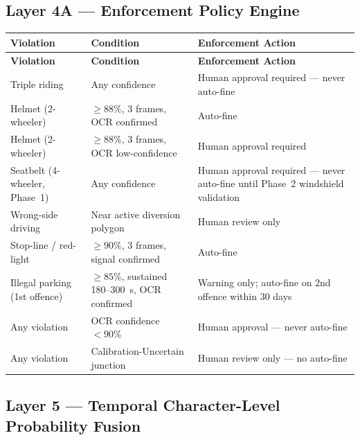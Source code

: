 \documentclass[11pt,a4paper]{article}
\begin{document}
\subsection*{Layer 4A — Enforcement Policy Engine}

\begin{longtable}{L{4cm} L{5cm} L{5.5cm}}
    \toprule
    \color{white}\textbf{Violation} & \color{white}\textbf{Condition} & \color{white}\textbf{Enforcement Action} \\
    \midrule
    \endfirsthead
    \toprule
    \color{white}\textbf{Violation} & \color{white}\textbf{Condition} & \color{white}\textbf{Enforcement Action} \\
    \midrule
    \endhead
    \bottomrule
    \endfoot

    Triple riding & Any confidence & Human approval required — never auto-fine \\
    Helmet (2-wheeler) & $\geq 88\%$, 3 frames, OCR confirmed & Auto-fine \\
    Helmet (2-wheeler) & $\geq 88\%$, 3 frames, OCR low-confidence & Human approval required \\
    Seatbelt (4-wheeler, Phase~1) & Any confidence & Human approval required --- never auto-fine until Phase~2 windshield validation \\
    Wrong-side driving & Near active diversion polygon & Human review only \\
    Stop-line / red-light & $\geq 90\%$, 3 frames, signal confirmed & Auto-fine \\
    Illegal parking (1st offence) & $\geq 85\%$, sustained 180–300~s, OCR confirmed & Warning only; auto-fine on 2nd offence within 30 days \\
    Any violation & OCR confidence $< 90\%$ & Human approval — never auto-fine \\
    Any violation & Calibration-Uncertain junction & Human review only — no auto-fine \\
\end{longtable}

\subsection*{Layer 5 — Temporal Character-Level Probability Fusion}
\end{document}
